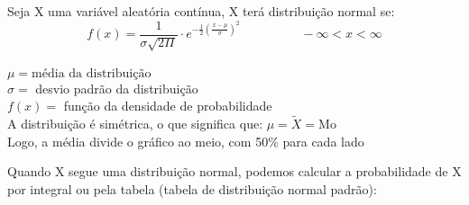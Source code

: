 \documentclass{article}
\begin{document}
Seja X uma variável aleatória contínua, X terá distribuição normal se:\\
\[f(x)=\frac{1}{\sigma \sqrt{2\Pi}}\cdot e^{\displaystyle -\frac{1}{2}\left(\frac{x-\mu}{\sigma}\right)^2}\hspace{2cm} -\infty <x <\infty\]\\


\noindent $ \mu = \text{média da distribuição}$\\
\noindent $\sigma =$ desvio padrão da distribuição\\
\noindent $f(x) =$ função da densidade de probabilidade\\

\noindent A distribuição é simétrica, o que significa que: $\mu=\tilde{X}=\text{Mo}$\\Logo, a média divide o gráfico ao meio, com 50\% para cada lado
\noindent

\begin{center}
\end{center}
Quando X segue uma distribuição normal, podemos calcular a probabilidade de X por integral ou pela tabela (tabela de distribuição normal padrão):\\
\end{document}
